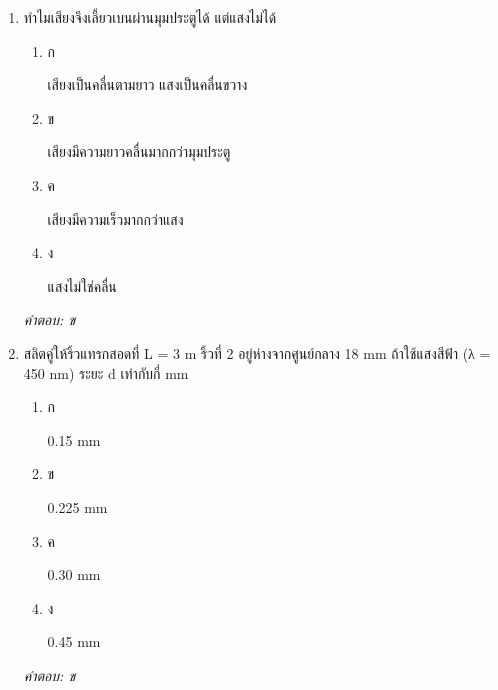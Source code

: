 \documentclass[12pt]{article}
\begin{document}
\begin{enumerate}[label=\arabic*., itemsep=0.5\baselineskip, topsep=0.5\baselineskip, leftmargin=*]
\item ทำไมเสียงจึงเลี้ยวเบนผ่านมุมประตูได้ แต่แสงไม่ได้
\begin{enumerate}[label=\alph*)., itemsep=0.3\baselineskip, topsep=0.3\baselineskip]
\item ก\ 
\begin{minipage}[t]{0.9\linewidth}
\raggedright เสียงเป็นคลื่นตามยาว แสงเป็นคลื่นขวาง
\end{minipage}
\item ข\ 
\begin{minipage}[t]{0.9\linewidth}
\raggedright เสียงมีความยาวคลื่นมากกว่ามุมประตู
\end{minipage}
\item ค\ 
\begin{minipage}[t]{0.9\linewidth}
\raggedright เสียงมีความเร็วมากกว่าแสง
\end{minipage}
\item ง\ 
\begin{minipage}[t]{0.9\linewidth}
\raggedright แสงไม่ใช่คลื่น
\end{minipage}
\end{enumerate}
\vspace{-0.3\baselineskip}
\begin{small}
\textit{คำตอบ: ข}
\end{small}

\item สลิตคู่ให้ริ้วแทรกสอดที่ L = 3 m ริ้วที่ 2 อยู่ห่างจากศูนย์กลาง 18 mm ถ้าใช้แสงสีฟ้า (λ = 450 nm) ระยะ d เท่ากับกี่ mm
\begin{enumerate}[label=\alph*)., itemsep=0.3\baselineskip, topsep=0.3\baselineskip]
\item ก\ 
\begin{minipage}[t]{0.9\linewidth}
\raggedright 0.15 mm
\end{minipage}
\item ข\ 
\begin{minipage}[t]{0.9\linewidth}
\raggedright 0.225 mm
\end{minipage}
\item ค\ 
\begin{minipage}[t]{0.9\linewidth}
\raggedright 0.30 mm
\end{minipage}
\item ง\ 
\begin{minipage}[t]{0.9\linewidth}
\raggedright 0.45 mm
\end{minipage}
\end{enumerate}
\vspace{-0.3\baselineskip}
\begin{small}
\textit{คำตอบ: ข}
\end{small}


\end{enumerate}
\end{document}

